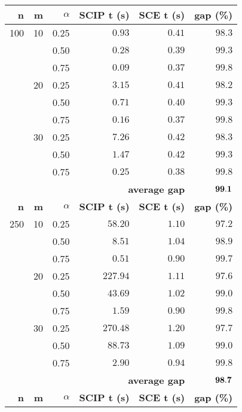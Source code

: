 
\renewcommand{\arraystretch}{1.5}%
\fontsize{8.5pt}{1em}\selectfont 
\begin{center}
\begin{tabular}[c]{|r|r|r|rrr|} \hline
\textbf{n}   & \textbf{m}  & \textbf{$\alpha$}    &\textbf{SCIP t (s)}& \textbf{SCE t (s)} & \textbf{gap (\%)} \\ \hline
100 & 10 & 0.25 & $  0.93$ & $  0.41$  & $98.3$ \\
    &    & 0.50 & $  0.28$ & $  0.39$  & $99.3$ \\
    &    & 0.75 & $  0.09$ & $  0.37$  & $99.8$ \\ \cline{2-6}
    & 20 & 0.25 & $  3.15$ & $  0.41$  & $98.2$ \\
    &    & 0.50 & $  0.71$ & $  0.40$  & $99.3$ \\
    &    & 0.75 & $  0.16$ & $  0.37$  & $99.8$ \\ \cline{2-6}
    & 30 & 0.25 & $  7.26$ & $  0.42$  & $98.3$ \\
    &    & 0.50 & $  1.47$ & $  0.42$  & $99.3$ \\
    &    & 0.75 & $  0.25$ & $  0.38$  & $99.8$ \\ \cline{2-6}
    & \multicolumn{4}{r}{\textbf{average gap}}  & $\bf 99.1$  \\ \hline \hline
\textbf{n}   & \textbf{m}  & \textbf{$\alpha$}    &\textbf{SCIP t (s)}& \textbf{SCE t (s)} & \textbf{gap (\%)} \\ \hline
250 & 10 & 0.25 & $ 58.20$ & $  1.10$  & $97.2$ \\
    &    & 0.50 & $  8.51$ & $  1.04$  & $98.9$ \\
    &    & 0.75 & $  0.51$ & $  0.90$  & $99.7$ \\ \cline{2-6}
    & 20 & 0.25 & $227.94$ & $  1.11$  & $97.6$ \\
    &    & 0.50 & $ 43.69$ & $  1.02$  & $99.0$ \\
    &    & 0.75 & $  1.59$ & $  0.90$  & $99.8$ \\ \cline{2-6}
    & 30 & 0.25 & $270.48$ & $  1.20$  & $97.7$ \\
    &    & 0.50 & $ 88.73$ & $  1.09$  & $99.0$ \\
    &    & 0.75 & $  2.90$ & $  0.94$  & $99.8$ \\ \cline{2-6}
    & \multicolumn{4}{r}{\textbf{average gap}}  & $\bf 98.7$  \\ \hline \hline
\textbf{n}   & \textbf{m}  & \textbf{$\alpha$}    &\textbf{SCIP t (s)}& \textbf{SCE t (s)} & \textbf{gap (\%)} \\ \hline

\end{tabular}
\end{center}
